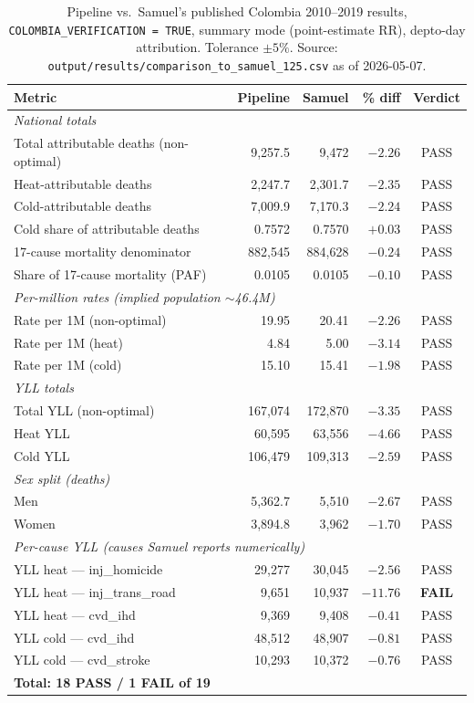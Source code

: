 \documentclass[11pt]{article}
\newcommand{\flag}[1]{\textcolor{red!70!black}{\textbf{#1}}}
\begin{document}
\begin{table}[h]
\centering
\small
\caption{Pipeline vs.\ Samuel's published Colombia 2010--2019 results,
\texttt{COLOMBIA\_VERIFICATION = TRUE}, summary mode (point-estimate RR), depto-day attribution. Tolerance $\pm 5\%$.
Source: \texttt{output/results/comparison\_to\_samuel\_125.csv} as of 2026-05-07.}
\label{tab:results}
\begin{tabular}{l r r r c}
\toprule
Metric & Pipeline & Samuel & \% diff & Verdict \\
\midrule
\multicolumn{5}{l}{\textit{National totals}} \\
Total attributable deaths (non-optimal) & 9{,}257.5 & 9{,}472 & $-2.26$ & PASS \\
Heat-attributable deaths & 2{,}247.7 & 2{,}301.7 & $-2.35$ & PASS \\
Cold-attributable deaths & 7{,}009.9 & 7{,}170.3 & $-2.24$ & PASS \\
Cold share of attributable deaths & 0.7572 & 0.7570 & $+0.03$ & PASS \\
17-cause mortality denominator & 882{,}545 & 884{,}628 & $-0.24$ & PASS \\
Share of 17-cause mortality (PAF) & 0.0105 & 0.0105 & $-0.10$ & PASS \\
\midrule
\multicolumn{5}{l}{\textit{Per-million rates (implied population $\sim$46.4M)}} \\
Rate per 1M (non-optimal) & 19.95 & 20.41 & $-2.26$ & PASS \\
Rate per 1M (heat) & 4.84 & 5.00 & $-3.14$ & PASS \\
Rate per 1M (cold) & 15.10 & 15.41 & $-1.98$ & PASS \\
\midrule
\multicolumn{5}{l}{\textit{YLL totals}} \\
Total YLL (non-optimal) & 167{,}074 & 172{,}870 & $-3.35$ & PASS \\
Heat YLL & 60{,}595 & 63{,}556 & $-4.66$ & PASS \\
Cold YLL & 106{,}479 & 109{,}313 & $-2.59$ & PASS \\
\midrule
\multicolumn{5}{l}{\textit{Sex split (deaths)}} \\
Men & 5{,}362.7 & 5{,}510 & $-2.67$ & PASS \\
Women & 3{,}894.8 & 3{,}962 & $-1.70$ & PASS \\
\midrule
\multicolumn{5}{l}{\textit{Per-cause YLL (causes Samuel reports numerically)}} \\
YLL heat --- inj\_homicide & 29{,}277 & 30{,}045 & $-2.56$ & PASS \\
YLL heat --- inj\_trans\_road & 9{,}651 & 10{,}937 & $\mathbf{-11.76}$ & \flag{FAIL} \\
YLL heat --- cvd\_ihd & 9{,}369 & 9{,}408 & $-0.41$ & PASS \\
YLL cold --- cvd\_ihd & 48{,}512 & 48{,}907 & $-0.81$ & PASS \\
YLL cold --- cvd\_stroke & 10{,}293 & 10{,}372 & $-0.76$ & PASS \\
\midrule
\multicolumn{5}{l}{\textbf{Total: 18 PASS / 1 FAIL of 19}} \\
\bottomrule
\end{tabular}
\end{table}
\end{document}
